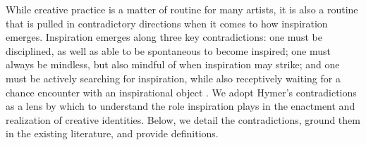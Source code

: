     While creative practice is a matter of routine for many artists, it is also a routine that is pulled in contradictory directions when it comes to how inspiration emerges. Inspiration emerges along three key contradictions: one must be disciplined, as well as able to be spontaneous to become inspired; one must always be mindless, but also mindful of when inspiration may strike; and one must be actively searching for inspiration, while also receptively waiting for a chance encounter with an inspirational object \cite{hymer1990inspiration}. We adopt Hymer's \cite{hymer1990inspiration} contradictions as a lens by which to understand the role inspiration plays in the enactment and realization of creative identities. Below, we detail the contradictions, ground them in the existing literature, and provide definitions. 

